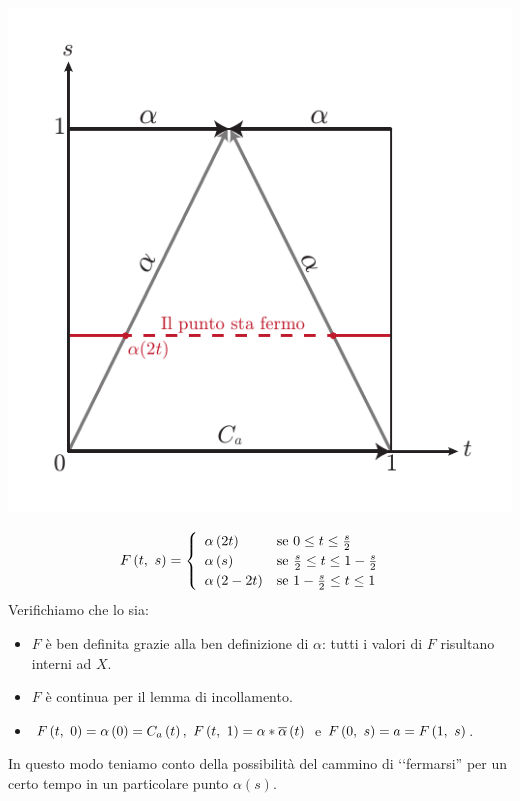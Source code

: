 \begin{demonstration}
\begin{enumerate}[label=\Roman*]
\begin{minipage}{.62\linewidth}
\end{minipage}
\begin{minipage}{.37\linewidth}
	\includegraphics[trim=0cm 0cm 0cm 0cm,clip,scale=0.6]{images/camminoinverso.pdf}
\end{minipage}
\begin{equation*}
	F\left(t,\ s\right)=\begin{cases}
		\begin{array}{ll}
			\alpha\left(2t\right)&\text{se }0\leq t\leq \frac{s}{2}\\
			\alpha\left(s\right)&\text{se }\frac{s}{2}\leq t\leq 1-\frac{s}{2}\\
			\alpha\left(2-2t\right)&\text{se }1-\frac{s}{2}\leq t\leq 1
		\end{array}
	\end{cases}
\end{equation*}
Verifichiamo che lo sia:
\begin{itemize}
\item $F$ è ben definita grazie alla ben definizione di $\alpha$: tutti i valori di $F$ risultano interni ad $X$.
\item $F$ è continua per il lemma di incollamento.
\item $\mvf{F}{t}{0}=\alpha\left(0\right)=C_a\left(t\right),\ \mvf{F}{t}{1}=\alpha\ast\overline{\alpha}\left(t\right)$ e $F\left(0,\ s\right)=a=F\left(1,\ s\right)$.
\end{itemize}
In questo modo teniamo conto della possibilità del cammino di ‘‘fermarsi'' per un certo tempo in un particolare punto $\alpha\left(s\right)$. 
\end{enumerate}
\vspace{-3mm}
\end{demonstration}
